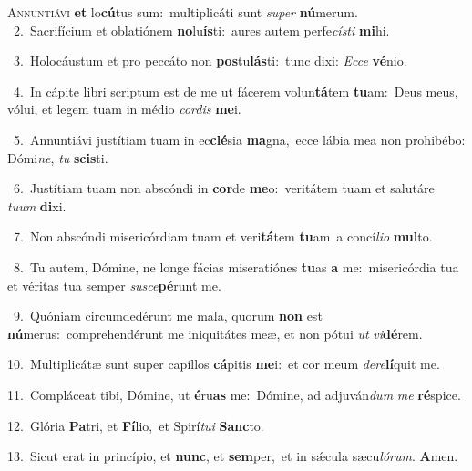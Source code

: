 \lettrine{\initial\textcolor{\initialcolor}{A}}{nnuntiávi} \textbf{et} lo\-\textbf{cú}\-tus sum:~\star multiplicáti sunt \textit{su}\-\textit{per} \textbf{nú}\-merum.\\
{\numbfont\textcolor{\numbcolor}{~2.}}~Sacrifícium et oblatiónem \textbf{no}\-lu\-\textbf{ís}\-ti:~\star aures autem perfe\-\textit{cís}\-\textit{ti} \textbf{mi}\-hi.\par
{\numbfont\textcolor{\numbcolor}{~3.}}~Holocáustum et pro peccáto non \textbf{pos}\-tu\-\textbf{lás}\-ti:~\star tunc dixi: \textit{Ec}\-\textit{ce} \textbf{vé}\-nio.\par
{\numbfont\textcolor{\numbcolor}{~4.}}~In cápite libri scriptum est de me ut fácerem volun\-\textbf{tá}\-tem \textbf{tu}\-am:~\star Deus meus, vólui, et legem tuam in médio \textit{cor}\-\textit{dis} \textbf{me}\-i.\par
{\numbfont\textcolor{\numbcolor}{~5.}}~Annuntiávi justítiam tuam in ec\-\textbf{clé}\-sia \textbf{ma}\-gna,~\star ecce lábia mea non prohibébo: Dómi\-\textit{ne}\-, \textit{tu} \textbf{scis}\-ti.\par
{\numbfont\textcolor{\numbcolor}{~6.}}~Justítiam tuam non abscóndi in \textbf{cor}\-de \textbf{me}\-o:~\star veritátem tuam et salutáre \textit{tu}\-\textit{um} \textbf{di}\-xi.\par
{\numbfont\textcolor{\numbcolor}{~7.}}~Non abscóndi misericórdiam tuam et veri\-\textbf{tá}\-tem \textbf{tu}\-am~\star a concí\-\textit{li}\-\textit{o} \textbf{mul}\-to.\par
{\numbfont\textcolor{\numbcolor}{~8.}}~Tu autem, Dómine, ne longe fácias miseratiónes \textbf{tu}\-as \textbf{a} me:~\star misericórdia tua et véritas tua semper \textit{su}\-\textit{sce}\textbf{pé}runt me.\par
{\numbfont\textcolor{\numbcolor}{~9.}}~Quóniam circumdedérunt me mala, quorum \textbf{non} est \textbf{nú}\-merus:~\star comprehendérunt me iniquitátes meæ, et non pótui \textit{ut} \textit{vi}\-\textbf{dé}rem.\par
{\numbfont\textcolor{\numbcolor}{10.}}~Multiplicátæ sunt super capíllos \textbf{cá}\-pitis \textbf{me}\-i:~\star et cor meum \textit{de}\-\textit{re}\textbf{lí}quit me.\par
{\numbfont\textcolor{\numbcolor}{11.}}~Compláceat tibi, Dómine, ut \textbf{é}\-ru\textbf{as} me:~\star Dómine, ad adjuván\textit{dum} \textit{me} \textbf{ré}\-spice.\par
{\numbfont\textcolor{\numbcolor}{12.}}~Glória \textbf{Pa}\-tri, et \textbf{Fí}\-lio,~\star et Spirí\-\textit{tu}\-\textit{i} \textbf{Sanc}\-to.\par
{\numbfont\textcolor{\numbcolor}{13.}}~Sicut erat in princípio, et \textbf{nunc}\-, et \textbf{sem}\-per,~\star et in sǽcula sæcu\-\textit{ló}\-\textit{rum}. \textbf{A}\-men.\par
